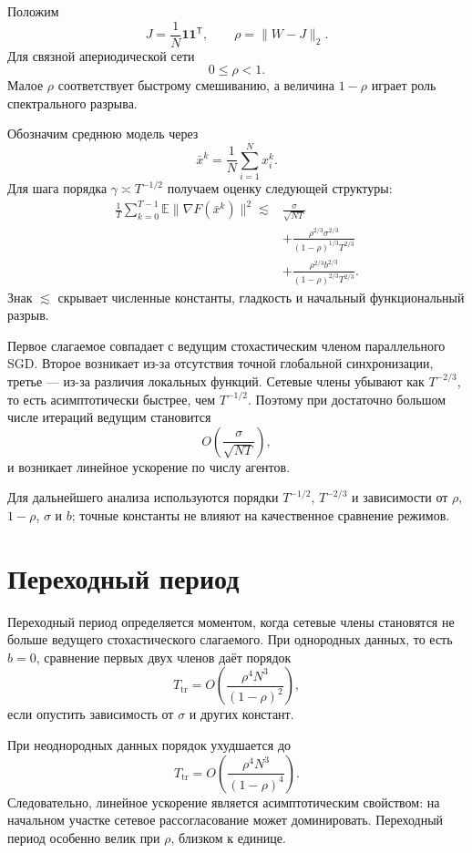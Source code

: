 Положим
\[
    J=\frac1N\mathbf1\mathbf1^{\mathsf T},
    \qquad
    \rho=\lVert W-J\rVert_2.
\]
Для связной апериодической сети
\[
    0\le\rho<1.
\]
Малое \(\rho\) соответствует быстрому смешиванию, а величина
\(1-\rho\) играет роль спектрального разрыва.

Обозначим среднюю модель через
\[
    \bar x^k
    =
    \frac1N\sum_{i=1}^{N}x_i^k.
\]
Для шага порядка \(\gamma\asymp T^{-1/2}\) получаем оценку
следующей структуры:
\[
\begin{aligned}
    \frac1T
    \sum_{k=0}^{T-1}
    \mathbb E
    \lVert\nabla F(\bar x^k)\rVert^2
    \lesssim{}&
    \frac{\sigma}{\sqrt{NT}}
    \\
    &+
    \frac{
        \rho^{2/3}\sigma^{2/3}
    }{
        (1-\rho)^{1/3}T^{2/3}
    }
    \\
    &+
    \frac{
        \rho^{2/3}b^{2/3}
    }{
        (1-\rho)^{2/3}T^{2/3}
    }.
\end{aligned}
\]
Знак \(\lesssim\) скрывает численные константы, гладкость и начальный
функциональный разрыв.

Первое слагаемое совпадает с ведущим стохастическим членом
параллельного SGD. Второе возникает из-за отсутствия точной глобальной
синхронизации, третье — из-за различия локальных функций. Сетевые
члены убывают как \(T^{-2/3}\), то есть асимптотически быстрее, чем
\(T^{-1/2}\). Поэтому при достаточно большом числе итераций ведущим
становится
\[
    O\left(\frac{\sigma}{\sqrt{NT}}\right),
\]
и возникает линейное ускорение по числу агентов.

Для дальнейшего анализа используются порядки \(T^{-1/2}\), \(T^{-2/3}\) и зависимости от \(\rho\), \(1-\rho\), \(\sigma\) и \(b\); точные константы не влияют на качественное сравнение режимов.

\section{Переходный период}

Переходный период определяется моментом, когда сетевые члены становятся
не больше ведущего стохастического слагаемого. При однородных данных,
то есть \(b=0\), сравнение первых двух членов даёт порядок
\[
    T_{\mathrm{tr}}
    =
    O\left(
        \frac{\rho^4N^3}{(1-\rho)^2}
    \right),
\]
если опустить зависимость от \(\sigma\) и других констант.

При неоднородных данных порядок ухудшается до
\[
    T_{\mathrm{tr}}
    =
    O\left(
        \frac{\rho^4N^3}{(1-\rho)^4}
    \right).
\]
Следовательно, линейное ускорение является асимптотическим свойством:
на начальном участке сетевое рассогласование может доминировать.
Переходный период особенно велик при \(\rho\), близком к единице.

